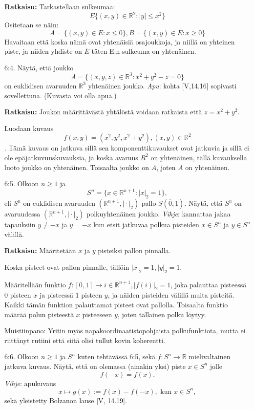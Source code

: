 \documentclass[12pt,a4paper,leqno]{amsart}
\begin{document}
\textbf{Ratkaisu: }
Tarkastellaan sulkeumaa: 
\[\overline{E} \{(x,y) \in \mathbb R^2: \vert y \vert \leq x^2\} \]
Ositetaan se näin:
\[A = \{(x, y) \in E : x \leq 0\}, B = \{(x, y) \in E: x \geq 0  \} \]
Havaitaan että koska nämä ovat yhtenäisiä osajoukkoja, ja niillä on yhteinen piste, ja niiden yhdiste on $\overline{E}$ täten E:n sulkeuma on yhtenäinen.
\bigskip

6:4.   Näytä, että joukko 
\[
A = \{(x,y,z) \in \mathbb R^3: x^2 + y^2 - z = 0\}
\]
on euklidisen avaruuden $\mathbb R^3$ yhtenäinen joukko. 
\textit{Apu}: kohta [V,14.16] sopivasti sovellettuna. (Kuvasta voi olla apua.)

\textbf{Ratkaisu: }
Joukon määrittävästä yhtälöstä voidaan ratkaista että $z = x^2 + y^2$.

Luodaan kuvaus \[f(x, y) = (x^2, y^2, x^2 + y^2), (x, y) \in \mathbb{R}^2\]. Tämä kuvaus on jatkuva sillä sen komponenttikuvaukset ovat jatkuvia ja sillä ei ole epäjatkuvuuskuvauksia, ja koska avaruus $R^2$ on yhtenäinen, tällä kuvauksella luoto joukko on yhtenäinen. Toisaalta joukko on $A$, joten $A$ on yhtenäinen.
\bigskip

6:5. Olkoon $n \ge 1$ ja
\[
S^n = \{x \in \mathbb R^{n+1}: \vert x\vert_2 = 1\},
\]
eli $S^n$ on euklidisen avaruuden $(\mathbb R^{n+1}, \vert \cdot  \vert_2)$ pallo $S(\overline{0},1)$.
 Näytä, että $S^n$ on avaruudessa $(\mathbb R^{n+1}, \vert \cdot  \vert_2)$ polkuyhtenäinen joukko. \textit{Vihje}: 
 kannattaa jakaa tapauksiin $y \neq -x$ ja  $y = -x$ kun etsit jatkuvaa polkua pisteiden $x \in S^n$ ja $y \in S^n$ välillä.

\textbf{Ratkaisu: }
Määritetään $x$ ja $y$ pisteiksi pallon pinnalla.

Koska pisteet ovat pallon pinnalle, tällöin $|x|_2=1, |y|_2 = 1$.

Määritellään funktio $f: [0, 1] \to i \in \mathbb{R}^{n+1}, |f(i)|_2 = 1 $, joka palauttaa pisteessä 0 pisteen $x$ ja pisteessä 1 pisteen $y$, ja näiden pisteiden välillä muita pisteitä. Kaikki tämän funktion palauttamat pisteet ovat pallolla. Toisaalta funktio määrää polun pisteestä $x$ pisteeseen $y$, joten tällainen polku löytyy.


Muistiinpano: Yritin myös napakoordinaatistopohjaista polkufunktiota, mutta ei riittänyt rutiini että siitä olisi tullut kovin koherentti.

 \bigskip

6:6. Olkoon $n \ge 1$ ja $S^n$ kuten tehtävässä 6:5, sekä $f: S^n \to \mathbb R$ mielivaltainen jatkuva kuvaus. 
Näytä, että on olemassa (ainakin yksi)  piste $x \in S^n$ jolle 
\[
f(-x) = f(x).
\] 
\textit{Vihje}: apukuvaus 
\[
x \mapsto g(x) := f(x) - f(-x),  \textrm{ kun } x \in S^n,
\] 
sekä yleistetty Bolzanon lause [V, 14.19]. 
\end{document}
